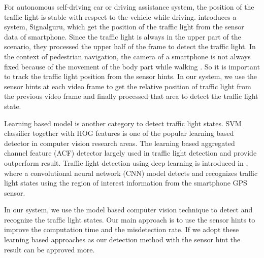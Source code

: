 For autonomous self-driving car or driving assistance system, the position of the traffic light is stable with respect to the vehicle while driving.
\cite{signalguru} introduces a system, Signalguru, which get the position of the traffic light from the sensor data of smartphone.
Since the traffic light is always in the upper part of the scenario, they processed the upper half of the frame to detect the traffic light.
In the context of pedestrian navigation, the camera of a smartphone is not always fixed because of the movement of the body part while walking \cite{sensor_pedestrian,sensor_pedestrian2}.
So it is important to track the traffic light position from the sensor hints.
In our system, we use the sensor hints at each video frame to get the relative position of traffic light from the previous video frame and finally processed that area to detect the traffic light state.

Learning based model \cite{learning,learning2} is another category to detect traffic light states.
SVM classifier together with HOG features \cite{selfdrive} is one of the popular learning based detector in computer vision research areas.
The learning based aggregated channel feature (ACF) \cite{acf,acf2,lisa_cvpr} detector largely used in traffic light detection and provide outperform result.
Traffic light detection using deep learning is introduced in \cite{cnn,cnn2,cnn3}, where a convolutional neural network (CNN) model detects and recognizes traffic light states using the region of interest information from the smartphone GPS sensor.

In our system, we use the model based computer vision technique to detect and recognize the traffic light states.
Our main approach is to use the sensor hints to improve the computation time and the misdetection rate.
If we adopt these learning based approaches as our detection method with the sensor hint the result can be approved more.  





